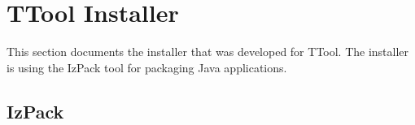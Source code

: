 \documentclass[12pt]{article}
\begin{document}
% 		
% 
% 
% 
% 
% 

\section{TTool Installer}

This section documents the installer that was developed for TTool. The installer is using the IzPack tool for packaging Java applications.

\subsection{IzPack}
\end{document}
